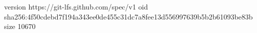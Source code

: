 version https://git-lfs.github.com/spec/v1
oid sha256:4f50cdebd7f194a343ee0de455c31dc7a8fee13d556997639b5b2b61093be83b
size 10670
